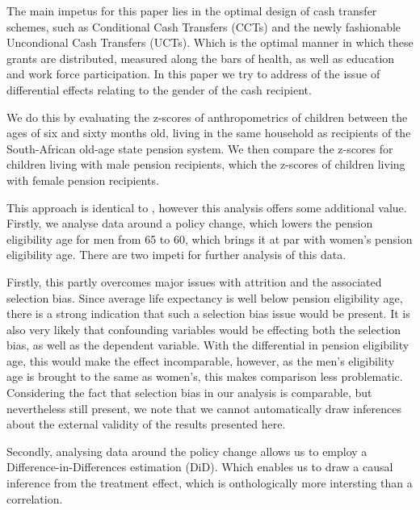 \begin{refsection}
The main impetus for this paper lies in the optimal design of cash transfer schemes,
such as Conditional Cash Transfers (CCTs) and the newly fashionable Uncondional Cash Transfers (UCTs).
Which is the optimal manner in which these grants are distributed, measured along the bars of health,
as well as education and work force participation.
In this paper \parencite[like in][]{duflo2000child,duflo2003grandmothers} we try to address of the issue of differential effects relating to the gender of the cash recipient.

We do this by evaluating the z-scores of anthropometrics of children between the ages of six and sixty months old, living in the same household as recipients of the South-African old-age state pension system. We then compare the z-scores for children living with male pension recipients, which the z-scores of children living with female pension recipients.

This approach is identical to \textcite{duflo2000child,duflo2003grandmothers}, however this analysis offers some additional value.
Firstly, we analyse data around a policy change, which lowers the pension eligibility age for men from 65 to 60,
which brings it at par with women's pension eligibility age.
There are two impeti for further analysis of this data.

Firstly, this partly overcomes major issues with attrition and the associated selection bias.
Since average life expectancy is well below pension eligibility age,
there is a strong indication that such a selection bias issue would be present.
It is also very likely that confounding variables would be effecting both the selection bias, as well as the dependent variable.
With the differential in pension eligibility age, this would make the effect incomparable,
however, as the men's eligibility age is brought to the same as women's, this makes comparison less problematic.
Considering the fact that selection bias in our analysis is comparable, but nevertheless still present,
we note that we cannot automatically draw inferences about the external validity of the results presented here.

Secondly, analysing data around the policy change allows us to employ a Difference-in-Differences estimation (DiD).
Which enables us to draw a causal inference from the treatment effect,
which is onthologically more intersting than a correlation.


\end{refsection}
